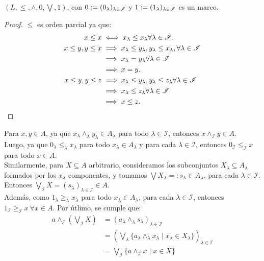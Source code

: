 \begin{lemma}
    $(L,\leq,\wedge, 0, \bigvee, 1)$, con
    $0:=(0_\lambda)_{\lambda\in\mathscr{I}}$ y
    $1:=(1_\lambda)_{\lambda\in\mathscr{I}}$ es un marco.
\end{lemma}
\begin{proof}
    $\leq$ es orden parcial ya que:
    \begin{align*}
        x \leq x
            & \iff x_\lambda \leq x_\lambda \forall \lambda\in\mathscr{I}. \\
        x \leq y, y \leq x
            &\implies x_\lambda \leq y_\lambda,
            y_\lambda \leq x_\lambda, \forall  \lambda\in\mathscr{I}\\
            &\implies x_\lambda = y_\lambda
            \forall\lambda\in\mathscr{I}\\
            &\implies x = y.\\
        x \leq y, y \leq z
            &\implies x_\lambda \leq y_\lambda,
            y_\lambda \leq z_\lambda
            \forall\lambda\in\mathscr{I}\\
            &\implies x_\lambda  \leq z_\lambda
            \forall  \lambda\in\mathscr{I}\\
            &\implies x \leq z.
    \end{align*}
\end{proof}
Para $x,y\in A$, ya que $x_\lambda\wedge_\lambda y_\lambda\in A_\lambda$ para todo $\lambda\in\mathscr{I}$, entonces $x\wedge_\mathscr{I}y\in A$.\\
Luego, ya que $0_\lambda\leq_\lambda x_\lambda$ para todo $x_\lambda\in A_\lambda$ y para cada $\lambda\in\mathscr{I}$, entonces $0_\mathscr{I}\leq_\mathscr{I}x$ para todo $x\in A$.\\
Similarmente, para $X\subseteq A$ arbitrario, consideramos los subconjuntos $X_\lambda\subseteq A_\lambda$ formados por los $x_\lambda$ componentes, y tomamos $\bigvee X_\lambda=:s_\lambda\in A_\lambda$,  para cada $\lambda\in\mathscr{I}$.\\
Entonces $\bigvee_\mathscr{I}X=(s_\lambda)_{\lambda\in\mathscr{I}}\in A$.\\
Además, como $1_\lambda\geq_\lambda x_\lambda$ para todo $x_\lambda\in A_\lambda$, para cada $\lambda\in\mathscr{I}$, entonces $1_\mathscr{I}\geq_\mathscr{I} x\ \forall x\in A$.
Por útlimo, se cumple que:
\begin{align*}
    a\wedge_\mathscr{I}\left(\bigvee_\mathscr{I} X\right) & = (a_\lambda\wedge_\lambda s_\lambda)_{\lambda\in\mathscr{I}}\\
    & = \left(\bigvee_\lambda\{a_\lambda\wedge_\lambda x_\lambda\mid x_\lambda\in X_\lambda\}\right)_{\lambda\in\mathscr{I}}\\
    & = \bigvee_\mathscr{I} \{a\wedge_\mathscr{I}x\mid x\in X\}
\end{align*}
